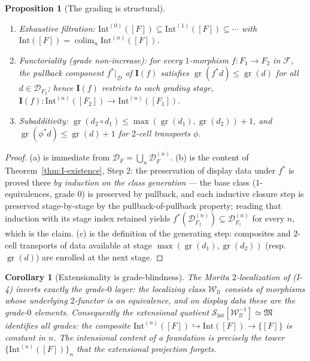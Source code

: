 \documentclass[11pt]{article}
\theoremstyle{plain}
\newtheorem{proposition}[theorem]{Proposition}
\newtheorem{corollary}[theorem]{Corollary}
\theoremstyle{definition}
\newcommand{\cS}{\mathcal{S}}
\newcommand{\cF}{\mathcal{F}}
\newcommand{\cD}{\mathcal{D}}
\newcommand{\fM}{\mathfrak{M}}
\newcommand{\gr}{\operatorname{gr}}
\newcommand{\Sint}{\cS_{\mathrm{int}}}
\newcommand{\II}{\mathbf{I}}
\newcommand{\cU}{\mathcal{U}}
\DeclareMathOperator{\colim}{colim}
\begin{document}
\begin{proposition}[The grading is structural]\label{prop:grading}
\begin{enumerate}[label=(\alph*)]
\item \emph{Exhaustive filtration}: $\mathrm{Int}^{(0)}([F]) \subseteq \mathrm{Int}^{(1)}([F]) \subseteq \cdots$ with $\mathrm{Int}([F]) = \colim_{n} \mathrm{Int}^{(n)}([F])$.
\item \emph{Functoriality (grade non-increase)}: for every $1$-morphism $f : F_1 \to F_2$ in $\cF$, the pullback component $f^*|_{\cD}$ of $\II(f)$ satisfies $\gr(f^* d) \leq \gr(d)$ for all $d \in \cD_{F_2}$; hence $\II(f)$ restricts to each grading stage, $\II(f) : \mathrm{Int}^{(n)}([F_2]) \to \mathrm{Int}^{(n)}([F_1])$.
\item \emph{Subadditivity}: $\gr(d_2 \circ d_1) \leq \max(\gr(d_1), \gr(d_2)) + 1$, and $\gr(\phi^* d) \leq \gr(d) + 1$ for $2$-cell transports $\phi$.
\end{enumerate}
\end{proposition}

\begin{proof}
(a) is immediate from $\cD_F = \bigcup_n \cD_F^{(n)}$. (b) is the content of Theorem~\ref{thm:I-existence}, Step 2: the preservation of display data under $f^*$ is proved there \emph{by induction on the class generation} --- the base class ($1$-equivalences, grade $0$) is preserved by pullback, and each inductive closure step is preserved stage-by-stage by the pullback-of-pullback property; reading that induction with its stage index retained yields $f^*(\cD_{F_2}^{(n)}) \subseteq \cD_{F_1}^{(n)}$ for every $n$, which is the claim. (c) is the definition of the generating step: composites and $2$-cell transports of data available at stage $\max(\gr(d_1), \gr(d_2))$ (resp.\ $\gr(d)$) are enrolled at the next stage.
\end{proof}

\begin{corollary}[Extensionality is grade-blindness]\label{cor:grade-collapse}
The Morita $2$-localization of (I-4) inverts exactly the grade-$0$ layer: the localizing class $\mathcal{W}_\cU$ consists of morphisms whose underlying $2$-functor is an equivalence, and on display data these are the grade-$0$ elements. Consequently the extensional quotient $\Sint[\mathcal{W}_\cU^{-1}] \simeq \fM$ identifies all grades: the composite $\mathrm{Int}^{(n)}([F]) \hookrightarrow \mathrm{Int}([F]) \to \{[F]\}$ is constant in $n$. The intensional content of a foundation is precisely the tower $\{\mathrm{Int}^{(n)}([F])\}_{n}$ that the extensional projection forgets.
\end{corollary}
\end{document}
